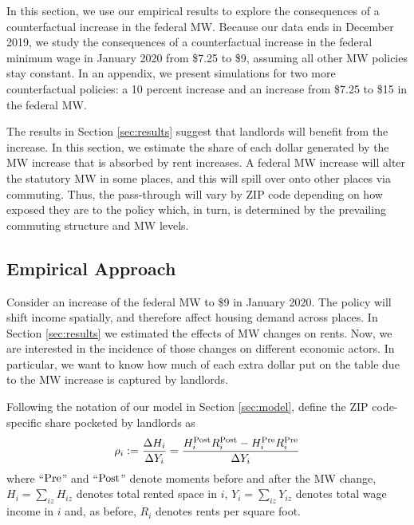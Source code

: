
In this section, we use our empirical results to explore the consequences of 
a counterfactual increase in the federal MW.
Because our data ends in December 2019, we study the consequences of a 
counterfactual increase in the federal minimum wage in January 2020 from 
\$7.25 to \$9, assuming all other MW policies stay constant. 
In an appendix, we present simulations for two more counterfactual policies: 
a 10 percent increase and an increase from \$7.25 to \$15 in the federal MW.

The results in Section \ref{sec:results} suggest that landlords will benefit
from the increase.
In this section, we estimate the share of each dollar generated by the MW 
increase that is absorbed by rent increases.
A federal MW increase will alter the statutory MW in some places, and this will
spill over onto other places via commuting.
Thus, the pass-through will vary by ZIP code depending on how exposed they
are to the policy which, in turn, is determined by the prevailing commuting
structure and MW levels.


\subsection{Empirical Approach}\label{sec:emp_cf}

Consider an increase of the federal MW to \$9 in January 2020.
The policy will shift income spatially, and therefore affect housing demand
across places.
In Section \ref{sec:results} we estimated the effects of MW changes on rents.
Now, we are interested in the incidence of those changes on different economic
actors.
In particular, we want to know how much of each extra dollar put on the table 
due to the MW increase is captured by landlords.

Following the notation of our model in Section \ref{sec:model}, define the 
ZIP code-specific share pocketed by landlords as
\begin{equation*}
    \rho_i := \frac{\Delta H_i}{\Delta Y_i} 
            = \frac{H^{\text{Post}}_i R^{\text{Post}}_i - H^{\text{Pre}}_i R^{\text{Pre}}_i}{\Delta Y_i} 
\end{equation*}
where
``$\text{Pre}$'' and ``$\text{Post}$'' denote moments before and after the MW change,
$H_i = \sum_{iz} H_{iz}$ denotes total rented space in $i$, 
$Y_i = \sum_{iz} Y_{iz}$ denotes total wage income in $i$ 
and, as before,
$R_i$ denotes rents per square foot.

